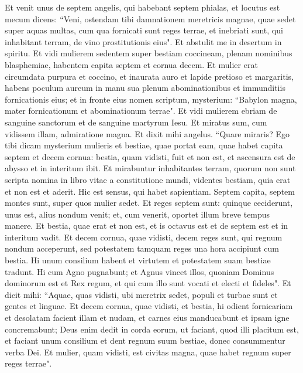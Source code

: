 \begin{biblechapter}  
\verse Et venit unus de septem angelis, qui habebant septem phialas, et locutus est mecum dicens: “Veni, ostendam tibi damnationem meretricis magnae, quae sedet super aquas multas, 
\verse cum qua fornicati sunt reges terrae, et inebriati sunt, qui inhabitant terram, de vino prostitutionis eius". 
\verse Et abstulit me in desertum in spiritu. Et vidi mulierem sedentem super bestiam coccineam, plenam nominibus blasphemiae, habentem capita septem et cornua decem.  
\verse Et mulier erat circumdata purpura et coccino, et inaurata auro et lapide pretioso et margaritis, habens poculum aureum in manu sua plenum abominationibus et immunditiis fornicationis eius; 
\verse et in fronte eius nomen scriptum, mysterium: “Babylon magna, mater fornicationum et abominationum terrae". 
\verse Et vidi mulierem ebriam de sanguine sanctorum et de sanguine martyrum Iesu. Et miratus sum, cum vidissem illam, admiratione magna. 
\verse Et dixit mihi angelus. “Quare miraris? Ego tibi dicam mysterium mulieris et bestiae, quae portat eam, quae habet capita septem et decem cornua: 
\verse bestia, quam vidisti, fuit et non est, et ascensura est de abysso et in interitum ibit. Et mirabuntur inhabitantes terram, quorum non sunt scripta nomina in libro vitae a constitutione mundi, videntes bestiam, quia erat et non est et aderit. 
\verse Hic est sensus, qui habet sapientiam. Septem capita, septem montes sunt, super quos mulier sedet. Et reges septem sunt: 
\verse quinque ceciderunt, unus est, alius nondum venit; et, cum venerit, oportet illum breve tempus manere. 
\verse Et bestia, quae erat et non est, et is octavus est et de septem est et in interitum vadit. 
\verse Et decem cornua, quae vidisti, decem reges sunt, qui regnum nondum acceperunt, sed potestatem tamquam reges una hora accipiunt cum bestia. 
\verse Hi unum consilium habent et virtutem et potestatem suam bestiae tradunt. 
\verse Hi cum Agno pugnabunt; et Agnus vincet illos, quoniam Dominus dominorum est et Rex regum, et qui cum illo sunt vocati et electi et fideles". 
\verse Et dicit mihi: “Aquae, quas vidisti, ubi meretrix sedet, populi et turbae sunt et gentes et linguae. 
\verse Et decem cornua, quae vidisti, et bestia, hi odient fornicariam et desolatam facient illam et nudam, et carnes eius manducabunt et ipsam igne concremabunt; 
\verse Deus enim dedit in corda eorum, ut faciant, quod illi placitum est, et faciant unum consilium et dent regnum suum bestiae, donec consummentur verba Dei. 
\verse Et mulier, quam vidisti, est civitas magna, quae habet regnum super reges terrae". 
\end{biblechapter}


